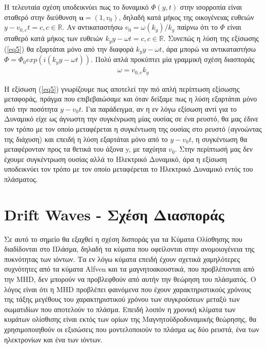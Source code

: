 \documentclass[a4paper]{article}
\begin{document}
	  			Η τελευταία σχέση υποδεικνύει πως το δυναμικό $\Phi(y,t)$ στην ισορροπία είναι σταθερό στην διεύθυνση $\bm{u} = (1,v_0)$, δηλαδή κατά μήκος της οικογένειας ευθειών $y-v_{0,e}t=c, c\in\mathbb{R}$. Αν αντικαταστήσω $v_0=\omega(k_y)/k_y$ παίρνω ότι το $\Phi$ είναι σταθερό κατά μήκος των ευθειών $k_yy-\omega t = c,c\in\mathbb{R}$. Συνεπώς η λύση της εξίσωσης (\ref{eq5}) θα εξαρτάται μόνο από την διαφορά $k_yy-\omega t$, άρα μπορώ να αντικαταστήσω $\Phi = \Phi_0exp\left(i(k_yy-\omega t)\right)$. Πολύ απλά προκύπτει μία γραμμική σχέση διασποράς 
	  			\begin{align}\label{eq7}
	  				\omega =v_{0,e}k_y 
	  			\end{align}
	  			
	  			
	  			 Η εξίσωση (\ref{eq5}) γνωρίζουμε πως αποτελεί την πιό απλή περίπτωση εξίσωσης μεταφοράς, πράγμα που επιβεβαιώσαμε και όταν δείξαμε πως η λύση εξαρτάται μόνο από την ποσότητα $y-v_0t$. Για παράδειγμα, αν η εν λόγω εξίσωση αντί για το Δυναμικό είχε ως άγνωστη την συγκένρωση μίας ουσίας σε ένα ρευστό, θα μας έδινε τον τρόπο με τον οποίο μεταφέρεται η συγκέντωση της ουσίας στο ρευστό (αγνοώντας της διάχυση) και επειδή η λύση εξαρτάται μόνο από το $y-v_0t$, η συγκέντωση θα μεταφέρονταν προς τα θετικά του άξονα y, με ταχύητα $v_0$. Στην περίπτωσή μας δεν έχουμε συγκέντρωση ουσίας αλλά το Ηλεκτρικό Δυναμικό, άρα η εξίσωση υποδεικνύει τον τρόπο με τον οποίο μεταφέρεται το Ηλεκτρικό Δυναμικό εντός του πλάσματος.%
	  			
	  	\section*{Drift Waves - Σχέση Διασποράς}

    
                Σε αυτό το σημείο θα εξαχθεί η σχέση δισποράς για τα Κύματα Ολίσθησης που διαδίδονται στο Πλάσμα, δηλαδή τα κύματα που οφείλονται στην ανομοιογένεια της πυκνότητας των ιόντων. Τα εν λόγω κύματα επειδή έχουν σχετικά χαμηλότερες συχνότητες από τα κύματα Alfven και τα μαγνητοακουστικά, που προβλέπονται από την MHD, δεν μπορούν να προβλεφθούν από αυτήν την θεώρηση του πλάσματός. Ο λόγος είναι ότι η MHD προβλέπει φαινόμενα που έχουν χαρακτηριστικούς χρόνους της τάξης μεγέθους του χαρακτηριστικού χρόνου των συγκρούσεων μεταξύ των σωματιδίων που αποτελούν το πλάσμα. Επειδή λοιπόν η χρονική κλίματα των κυμάτων ολίσθισης είναι εκτός των ορίων της Μαγνητοϋδροδυναμικής θεώρησης, θα χρησιμοποιηθούν οι εξισώσεις που μοντελοποιούν το πλάσμα ως δύο ρευστά, ένα των ηλεκτρονίων και ένα των ιόντων.
                
\end{document}
